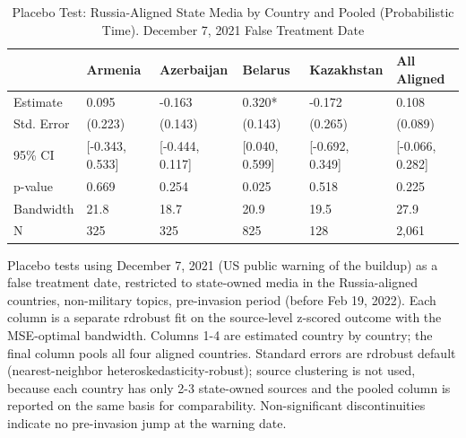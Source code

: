 \begin{table}[t]
\caption{\label{tab:s13}Placebo Test: Russia-Aligned State Media by Country and Pooled (Probabilistic Time). December 7, 2021 False Treatment Date}
\fontsize{12.0pt}{14.0pt}\selectfont
\begin{tabular*}{\linewidth}{@{\extracolsep{\fill}}llllll}
\toprule
 & Armenia & Azerbaijan & Belarus & Kazakhstan & All Aligned \\ 
\midrule\addlinespace[2.5pt]
Estimate & 0.095 & -0.163 & 0.320* & -0.172 & 0.108 \\ 
Std. Error & (0.223) & (0.143) & (0.143) & (0.265) & (0.089) \\ 
95\% CI & [-0.343, 0.533] & [-0.444, 0.117] & [0.040, 0.599] & [-0.692, 0.349] & [-0.066, 0.282] \\ 
p-value & 0.669 & 0.254 & 0.025 & 0.518 & 0.225 \\ 
Bandwidth & 21.8 & 18.7 & 20.9 & 19.5 & 27.9 \\ 
N & 325 & 325 & 825 & 128 & 2,061 \\ 
\bottomrule
\end{tabular*}
\begin{minipage}{\linewidth}
\vspace{.05em}
Placebo tests using December 7, 2021 (US public warning of the buildup) as a
false treatment date, restricted to state-owned media in the Russia-aligned
countries, non-military topics, pre-invasion period (before Feb 19, 2022). Each
column is a separate rdrobust fit on the source-level z-scored outcome with the
MSE-optimal bandwidth. Columns 1-4 are estimated country by country; the final
column pools all four aligned countries. Standard errors are rdrobust default
(nearest-neighbor heteroskedasticity-robust); source clustering is not used,
because each country has only 2-3 state-owned sources and the pooled column is
reported on the same basis for comparability. Non-significant discontinuities
indicate no pre-invasion jump at the warning date.\\
\end{minipage}
\end{table}

